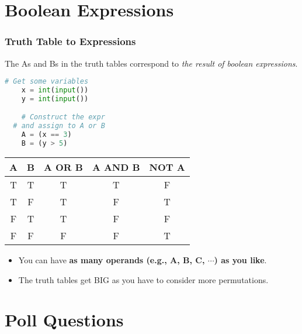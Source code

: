 \documentclass{beamer}
\begin{document}
\section{Boolean Expressions}

%
%
\begin{frame}[fragile]
	\frametitle{Truth Table to Expressions}
	\vfill
	The As and Bs in the truth tables correspond to \textit{the result of boolean expressions}.
	\vfill
	\begin{minipage}{0.4\textwidth}
		\begin{lstlisting}[language=Python,autogobble]
	# Get some variables 
	x = int(input())
	y = int(input())

	# Construct the expr
  # and assign to A or B
	A = (x == 3)
	B = (y > 5)
		\end{lstlisting}
	\end{minipage}
	\begin{minipage}{0.59\textwidth}
		\begin{table}[]
			\begin{tabular}{|cc|c|c|c|}
				{\color[HTML]{CD9934} \textbf{A}} & {\color[HTML]{3531FF} \textbf{B}} & \textbf{A OR B} & \textbf{A AND B} & \textbf{NOT A} \\ \hline
				{\color[HTML]{CD9934} T}          & {\color[HTML]{3531FF} T}          & T               & T                & F              \\
				{\color[HTML]{CD9934} T}          & {\color[HTML]{3531FF} F}          & T               & F                & T              \\
				{\color[HTML]{CD9934} F}          & {\color[HTML]{3531FF} T}          & T               & F                & F              \\
				{\color[HTML]{CD9934} F}          & {\color[HTML]{3531FF} F}          & F               & F                & T             
			\end{tabular}
		\end{table}
	\end{minipage}
	\vfill
	\pause
	\begin{itemize}
		\item You can have \textbf{as many operands (e.g., A, B, C, $\cdots$) as you like}.
		\item The truth tables get BIG as you have to consider more permutations.
	\end{itemize}
\end{frame}

\section{Poll Questions}
\end{document}
